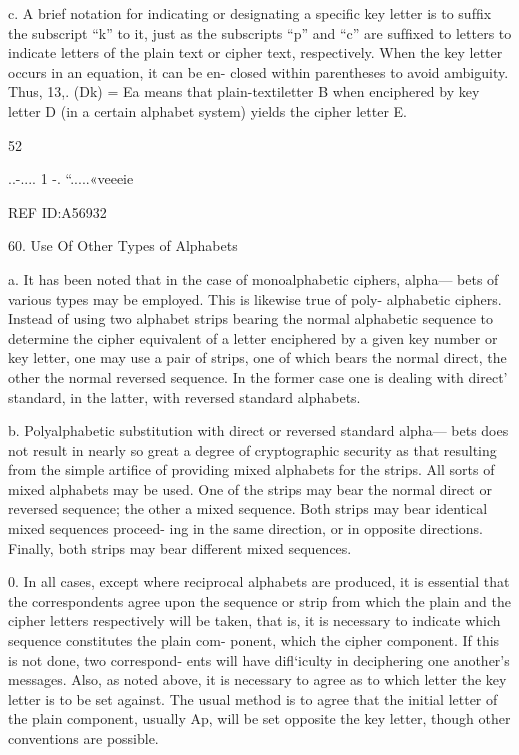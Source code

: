 {{{c. A brief notation for indicating or designating a speciﬁc key letter
is to sufﬁx the subscript “k” to it, just as the subscripts “p” and “c”
are sufﬁxed to letters to indicate letters of the plain text or cipher text,
respectively. When the key letter occurs in an equation, it can be en-
closed within parentheses to avoid ambiguity. Thus, 13,. (Dk) = Ea
means that plain-textiletter B when enciphered by key letter D (in a
certain alphabet system) yields the cipher letter E.

52

..-.... 1 -. “.....«veeeie

 

 

 

 

 

REF ID:A56932

60. Use Of Other Types of Alphabets

a. It has been noted that in the case of monoalphabetic ciphers, alpha—
bets of various types may be employed. This is likewise true of poly-
alphabetic ciphers. Instead of using two alphabet strips bearing the
normal alphabetic sequence to determine the cipher equivalent of a letter
enciphered by a given key number or key letter, one may use a pair of
strips, one of which bears the normal direct, the other the normal reversed
sequence. In the former case one is dealing with direct' standard, in the
latter, with reversed standard alphabets.

b. Polyalphabetic substitution with direct or reversed standard alpha—
bets does not result in nearly so great a degree of cryptographic security
as that resulting from the simple artiﬁce of providing mixed alphabets
for the strips. All sorts of mixed alphabets may be used. One of the
strips may bear the normal direct or reversed sequence; the other a
mixed sequence. Both strips may bear identical mixed sequences proceed-
ing in the same direction, or in opposite directions. Finally, both strips
may bear different mixed sequences.

0. In all cases, except where reciprocal alphabets are produced, it is
essential that the correspondents agree upon the sequence or strip from
which the plain and the cipher letters respectively will be taken, that is,
it is necessary to indicate which sequence constitutes the plain com-
ponent, which the cipher component. If this is not done, two correspond-
ents will have diﬂ‘iculty in deciphering one another’s messages. Also, as
noted above, it is necessary to agree as to which letter the key letter is to
be set against. The usual method is to agree that the initial letter of the
plain component, usually Ap, will be set opposite the key letter, though
other conventions are possible.

}}}
